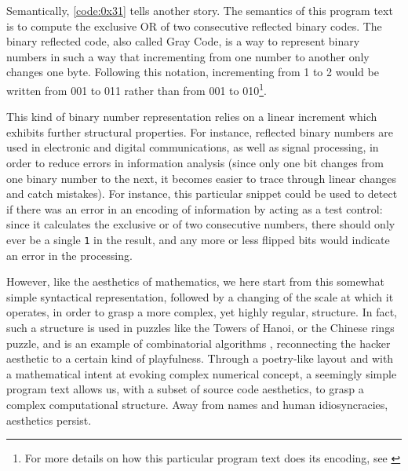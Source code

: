 \begin{listing}
    \inputminted{asm}{./corpus/riddle_0x31.asm}
    \caption{This Assembly listing represents a pair of numbers as reflected binary numbers, and then performs a logical \lstinline{xor} operation on a pair of numbers. The structure of the program text itself, through its symmetry, hints at the patterns exhibited by such reflected binary encoding \citep{xorpd_xchg_2014}.}
    \label{code:0x31}
\end{listing}

Semantically, \ref{code:0x31} tells another story. The semantics of this program text is to compute the exclusive OR of two consecutive reflected binary codes. The binary reflected code, also called Gray Code, is a way to represent binary numbers in such a way that incrementing from one number to another only changes one byte. Following this notation, incrementing from 1 to 2 would be written from 001 to 011 rather than from 001 to 010\footnote{For more details on how this particular program text does its encoding, see \citep{sanchez_solutions_2016}}.

This kind of binary number representation relies on a linear increment which exhibits further structural properties. For instance, reflected binary numbers are used in electronic and digital communications, as well as signal processing, in order to reduce errors in information analysis (since only one bit changes from one binary number to the next, it becomes easier to trace through linear changes and catch mistakes). For instance, this particular snippet could be used to detect if there was an error in an encoding of information by acting as a test control: since it calculates the exclusive or of two consecutive numbers, there should only ever be a single \lstinline{1} in the result, and any more or less flipped bits would indicate an error in the processing.

However, like the aesthetics of mathematics, we here start from this somewhat simple syntactical representation, followed by a changing of the scale at which it operates, in order to grasp a more complex, yet highly regular, structure. In fact, such a structure is used in puzzles like the Towers of Hanoi, or the Chinese rings puzzle, and is an example of combinatorial algorithms \citep{knuth_art_2011}, reconnecting the hacker aesthetic to a certain kind of playfulness. Through a poetry-like layout and with a mathematical intent at evoking complex numerical concept, a seemingly simple program text allows us, with a subset of source code aesthetics, to grasp a complex computational structure. Away from names and human idiosyncracies, aesthetics persist.

